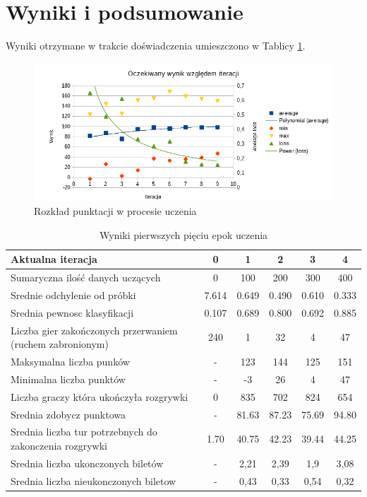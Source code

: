 \documentclass[12pt, oneside]{report}
\begin{document}
\section{Wyniki i podsumowanie}
Wyniki otrzymane w trakcie doświadczenia umieszczono w Tablicy \ref{table:learn_metrics}.

\begin{figure}
	\includegraphics[width=\linewidth]{WykresPunktowPosteIteracji.png}
	\caption{Rozkład punktacji w procesie uczenia}
	\label{figure:learn_results}
\end{figure}

\begin{table}[h]
	\begin{center}
		\begin{tabular}{| p{6cm} | c | c | c | c | c |} \hline
			Aktualna iteracja & 0 & 1 & 2 & 3 & 4 \\ \hline
			Sumaryczna ilość danych uczących & 0 & 100 & 200 & 300 & 400 \\ \hline
			Srednie odchylenie od próbki & 7.614 & 0.649 & 0.490 & 0.610 & 0.333 \\ \hline
			Srednia pewnosc klasyfikacji & 0.107 & 0.689 & 0.800 & 0.692 & 0.885 \\ \hline
			Liczba gier zakończonych przerwaniem (ruchem zabronionym) & 240 & 1 & 32 & 4 & 47 \\ \hline
			Maksymalna liczba punków & - & 123 & 144 & 125 & 151 \\ \hline
			Minimalna liczba punktów & - & -3 & 26 & 4 & 47 \\ \hline
			Liczba graczy która ukończyła rozgrywki & 0 & 835 & 702 & 824 & 654 \\ \hline
			Srednia zdobycz punktowa & - & 81.63 & 87.23 & 75.69 & 94.80 \\ \hline
			Srednia liczba tur potrzebnych do zakonczenia rozgrywki & 1.70 & 40.75 & 42.23 & 39.44 & 44.25 \\ \hline
			Srednia liczba ukonczonych biletów & - & 2,21 & 2,39 & 1,9 & 3,08 \\ \hline
			Srednia liczba nieukonczonych biletow & - & 0,43 & 0,33 & 0,54 & 0,32 \\ \hline
		\end{tabular}	
		\caption{Wyniki pierwszych pięciu epok uczenia}
		\label{table:learn_metrics}
	\end{center}
\end{table}
\end{document}
